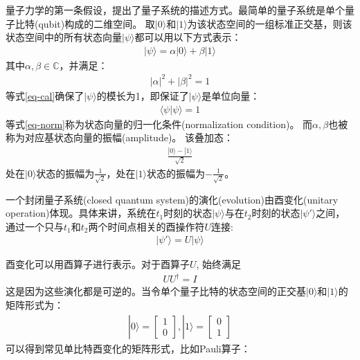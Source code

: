 量子力学的第一条假设，提出了量子系统的描述方式。最简单的量子系统是单个量子比特(qubit)构成的二维空间。
取$|0\rangle$和$|1\rangle$为该状态空间的一组标准正交基，则该状态空间中的所有状态向量$|\psi\rangle$都可以用以下方式表示：
\begin{align}
    |\psi\rangle = \alpha|0\rangle + \beta|1\rangle
\end{align}
其中$\alpha,\beta\in \mathbb{C}$，并满足：
\begin{align}
    |\alpha|^2+|\beta|^2  = 1
    \label{eq-cal}
\end{align}
等式\ref{eq-cal}确保了$|\psi\rangle$的模长为1，即保证了$|\psi\rangle$是单位向量：
\begin{align}
    \langle\psi|\psi\rangle = 1
    \label{eq-norm}
\end{align}
等式\ref{eq-norm}称为状态向量的归一化条件(normalization condition)。
而\(\alpha,\beta\)也被称为对应基状态向量的振幅(amplitude)。
该叠加态：
\begin{align}
    \frac{|0\rangle-|1\rangle}{\sqrt{2}}
\end{align}
处在$|0\rangle$状态的振幅为$\frac{1}{\sqrt{2}}$，处在$|1\rangle$状态的振幅为$-\frac{1}{\sqrt{2}}$。
\begin{theorem}
    一个封闭量子系统(closed quantum system)的演化(evolution)由酉变化(unitary operation)体现。具体来讲，系统在$t_1$时刻的状态$|\psi\rangle$与在$t_2$时刻的状态$|\psi'\rangle$之间，通过一个只与$t_1$和$t_2$两个时间点相关的酉操作符$U$连接:
    \begin{align}
        |\psi'\rangle = U|\psi\rangle
    \end{align}
\end{theorem}
酉变化可以用酉算子进行表示。对于酉算子$U$, 始终满足
\begin{align}
    U U^\dagger = I
\end{align}
这是因为这些演化都是可逆的。当令单个量子比特的状态空间的正交基$|0\rangle$和$|1\rangle$的矩阵形式为：
\begin{align}
    |0\rangle = \left[\begin{matrix}
        1\\0
    \end{matrix}\right],|1\rangle = \left[\begin{matrix}
        0\\1
    \end{matrix}\right]
\end{align}
可以得到常见单比特酉变化的矩阵形式，比如Pauli算子：
